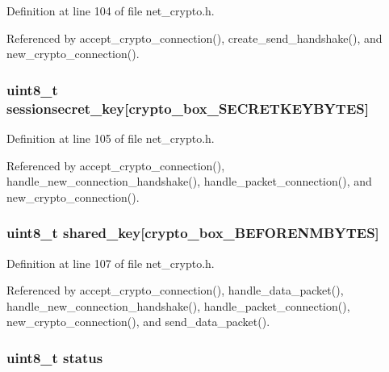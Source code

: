 Definition at line 104 of file net\+\_\+crypto.\+h.



Referenced by accept\+\_\+crypto\+\_\+connection(), create\+\_\+send\+\_\+handshake(), and new\+\_\+crypto\+\_\+connection().

\hypertarget{struct_crypto___connection_a5f38fc9ff1b20b61ffbb56d9e7f5c892}{
\subsubsection[{sessionsecret\+\_\+key}]{\setlength{\rightskip}{0pt plus 5cm}uint8\+\_\+t sessionsecret\+\_\+key\mbox{[}crypto\+\_\+box\+\_\+\+S\+E\+C\+R\+E\+T\+K\+E\+Y\+B\+Y\+T\+E\+S\mbox{]}}}\label{struct_crypto___connection_a5f38fc9ff1b20b61ffbb56d9e7f5c892}


Definition at line 105 of file net\+\_\+crypto.\+h.



Referenced by accept\+\_\+crypto\+\_\+connection(), handle\+\_\+new\+\_\+connection\+\_\+handshake(), handle\+\_\+packet\+\_\+connection(), and new\+\_\+crypto\+\_\+connection().

\hypertarget{struct_crypto___connection_a81ead9fac55a0cedc30a96253a2c5119}{
\subsubsection[{shared\+\_\+key}]{\setlength{\rightskip}{0pt plus 5cm}uint8\+\_\+t shared\+\_\+key\mbox{[}crypto\+\_\+box\+\_\+\+B\+E\+F\+O\+R\+E\+N\+M\+B\+Y\+T\+E\+S\mbox{]}}}\label{struct_crypto___connection_a81ead9fac55a0cedc30a96253a2c5119}


Definition at line 107 of file net\+\_\+crypto.\+h.



Referenced by accept\+\_\+crypto\+\_\+connection(), handle\+\_\+data\+\_\+packet(), handle\+\_\+new\+\_\+connection\+\_\+handshake(), handle\+\_\+packet\+\_\+connection(), new\+\_\+crypto\+\_\+connection(), and send\+\_\+data\+\_\+packet().

\hypertarget{struct_crypto___connection_ade818037fd6c985038ff29656089758d}{
\subsubsection[{status}]{\setlength{\rightskip}{0pt plus 5cm}uint8\+\_\+t status}}\label{struct_crypto___connection_ade818037fd6c985038ff29656089758d}


